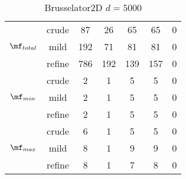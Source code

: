 \begin{table}[htb]
\begin{tabular}{ |c|c|c|c|c|c|c| }
  & crude & 87 & 26 & 65 & 65 & 0 \\
 $\mf_{total}$  & mild & 192 & 71 & 81 & 81 & 0 \\
  & refine & 786 & 192 & 139 & 157 & 0 \\
\hline
  & crude & 2 & 1 & 5 & 5 & 0 \\
 $\mf_{min}$  & mild & 2 & 1 & 5 & 5 & 0 \\
  & refine & 2 & 1 & 5 & 5 & 0 \\
\hline
  & crude & 6 & 1 & 5 & 5 & 0 \\
 $\mf_{max}$  & mild & 8 & 1 & 9 & 9 & 0 \\
  & refine & 8 & 1 & 7 & 8 & 0 \\
\hline
\end{tabular}
\caption{ Brusselator2D $d=5000$ }
\end{table}
